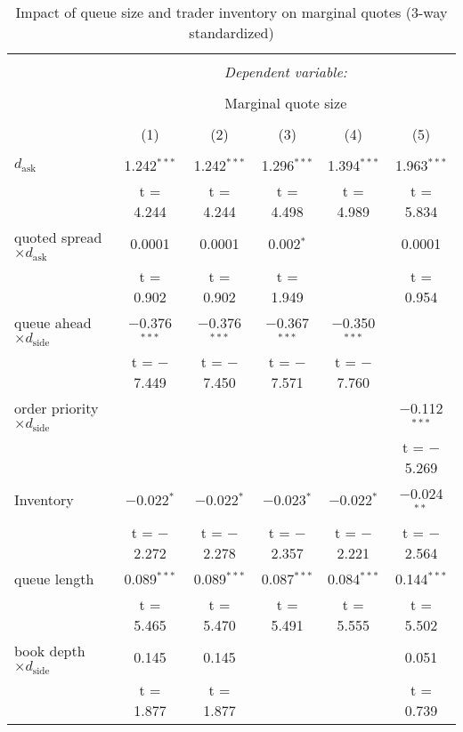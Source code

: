 
\begin{table}[!htbp] \centering 
  \caption{Impact of queue size and trader inventory on marginal quotes (3-way standardized)} 
  \label{} 
\begin{tabular}{@{\extracolsep{5pt}}lccccc} 
\\[-1.8ex]\hline 
\hline \\[-1.8ex] 
 & \multicolumn{5}{c}{\textit{Dependent variable:}} \\ 
\cline{2-6} 
\\[-1.8ex] & \multicolumn{5}{c}{Marginal quote size} \\ 
\\[-1.8ex] & (1) & (2) & (3) & (4) & (5)\\ 
\hline \\[-1.8ex] 
 $d_{\text{ask}}$ & 1.242$^{***}$ & 1.242$^{***}$ & 1.296$^{***}$ & 1.394$^{***}$ & 1.963$^{***}$ \\ 
  & t = 4.244 & t = 4.244 & t = 4.498 & t = 4.989 & t = 5.834 \\ 
  quoted spread $\times d_{\text{ask}}$  & 0.0001 & 0.0001 & 0.002$^{*}$ &  & 0.0001 \\ 
  & t = 0.902 & t = 0.902 & t = 1.949 &  & t = 0.954 \\ 
  queue ahead $\times d_{\text{side}}$  & $-$0.376$^{***}$ & $-$0.376$^{***}$ & $-$0.367$^{***}$ & $-$0.350$^{***}$ &  \\ 
  & t = $-$7.449 & t = $-$7.450 & t = $-$7.571 & t = $-$7.760 &  \\ 
  order priority $\times d_{\text{side}}$  &  &  &  &  & $-$0.112$^{***}$ \\ 
  &  &  &  &  & t = $-$5.269 \\ 
  Inventory & $-$0.022$^{*}$ & $-$0.022$^{*}$ & $-$0.023$^{*}$ & $-$0.022$^{*}$ & $-$0.024$^{**}$ \\ 
  & t = $-$2.272 & t = $-$2.278 & t = $-$2.357 & t = $-$2.221 & t = $-$2.564 \\ 
  queue length & 0.089$^{***}$ & 0.089$^{***}$ & 0.087$^{***}$ & 0.084$^{***}$ & 0.144$^{***}$ \\ 
  & t = 5.465 & t = 5.470 & t = 5.491 & t = 5.555 & t = 5.502 \\ 
  book depth $\times d_{\text{side}}$ & 0.145 & 0.145 &  &  & 0.051 \\ 
  & t = 1.877 & t = 1.877 &  &  & t = 0.739 \\ 

\end{tabular}
\end{table}
